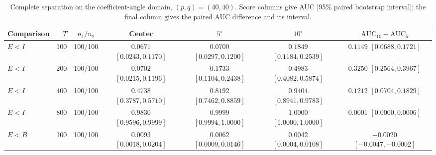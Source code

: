 \documentclass[12pt,letterpaper]{article}
\def\spacingset#1{\renewcommand{\baselinestretch}{#1}\small\normalsize}
\theoremstyle{plain}
\theoremstyle{definition}
\begin{document}
\begin{table}[p]
\begingroup
\spacingset{1.0}
\small\centering
\caption{Complete separation on the coefficient-angle domain, $(p,q)=(40,40)$. Score columns give AUC [95\% paired bootstrap interval]; the final column gives the paired AUC difference and its interval.}
\label{s23:lambda:allauc:p40q40}
\footnotesize
\setlength{\tabcolsep}{3.5pt}
\renewcommand{\arraystretch}{1.10}
\begin{adjustbox}{max width=\linewidth}
\begin{tabular}{lrccccc}
\toprule
Comparison & $T$ & $n_1/n_2$ & Center & $5^\circ$ & $10^\circ$ & $\mathrm{AUC}_{10}-\mathrm{AUC}_{5}$\\
\midrule
$E<I$ & 100 & 100/100 & \shortstack{$0.0671$\\{\scriptsize$[0.0243,0.1170]$}} & \shortstack{$0.0700$\\{\scriptsize$[0.0297,0.1200]$}} & \shortstack{$0.1849$\\{\scriptsize$[0.1184,0.2539]$}} & \shortstack{$0.1149$\\{\scriptsize$[0.0688,0.1721]$}}\\
$E<I$ & 200 & 100/100 & \shortstack{$0.0702$\\{\scriptsize$[0.0215,0.1196]$}} & \shortstack{$0.1733$\\{\scriptsize$[0.1104,0.2438]$}} & \shortstack{$0.4983$\\{\scriptsize$[0.4082,0.5874]$}} & \shortstack{$0.3250$\\{\scriptsize$[0.2564,0.3967]$}}\\
$E<I$ & 400 & 100/100 & \shortstack{$0.4738$\\{\scriptsize$[0.3787,0.5710]$}} & \shortstack{$0.8192$\\{\scriptsize$[0.7462,0.8859]$}} & \shortstack{$0.9404$\\{\scriptsize$[0.8941,0.9783]$}} & \shortstack{$0.1212$\\{\scriptsize$[0.0704,0.1829]$}}\\
$E<I$ & 800 & 100/100 & \shortstack{$0.9830$\\{\scriptsize$[0.9596,0.9999]$}} & \shortstack{$0.9999$\\{\scriptsize$[0.9994,1.0000]$}} & \shortstack{$1.0000$\\{\scriptsize$[1.0000,1.0000]$}} & \shortstack{$0.0001$\\{\scriptsize$[0.0000,0.0006]$}}\\
\addlinespace
$E<B$ & 100 & 100/100 & \shortstack{$0.0093$\\{\scriptsize$[0.0018,0.0204]$}} & \shortstack{$0.0062$\\{\scriptsize$[0.0009,0.0146]$}} & \shortstack{$0.0042$\\{\scriptsize$[0.0004,0.0108]$}} & \shortstack{$-0.0020$\\{\scriptsize$[-0.0047,-0.0002]$}}\\

\end{tabular}
\end{adjustbox}
\end{table}
\end{document}
